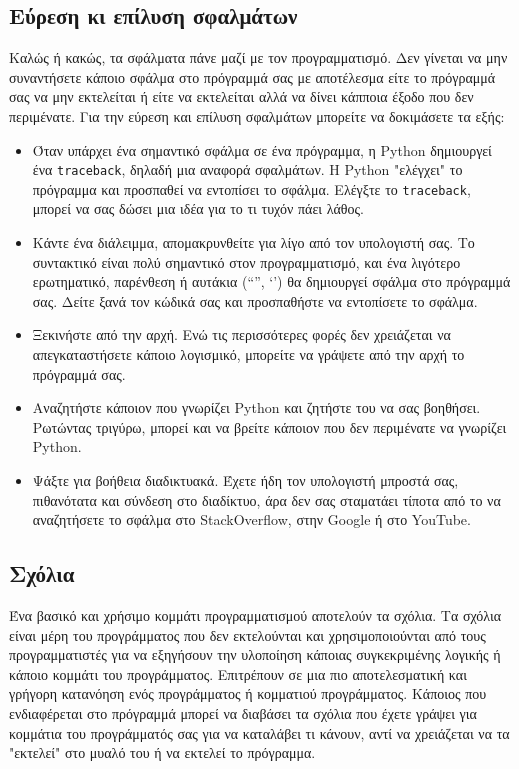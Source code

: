 \documentclass[14pt]{extreport}
\begin{document}
\subsection{Εύρεση κι επίλυση σφαλμάτων}

Καλώς ή κακώς, τα σφάλματα πάνε μαζί με τον προγραμματισμό. Δεν γίνεται να μην συναντήσετε κάποιο σφάλμα στο πρόγραμμά σας με αποτέλεσμα είτε το πρόγραμμά σας να μην εκτελείται ή είτε να εκτελείται αλλά να δίνει κάπποια έξοδο που δεν περιμένατε. Για την εύρεση και επίλυση σφαλμάτων μπορείτε να δοκιμάσετε τα εξής:

\begin{itemize}
    \itemsep0cm
    \item Όταν υπάρχει ένα σημαντικό σφάλμα σε ένα πρόγραμμα, η Python δημιουργεί ένα \lstinline{traceback}, δηλαδή μια αναφορά σφαλμάτων. Η Python "ελέγχει" το πρόγραμμα και προσπαθεί να εντοπίσει το σφάλμα. Ελέγξτε το \lstinline{traceback}, μπορεί να σας δώσει μια ιδέα για το τι τυχόν πάει λάθος.
    \item Κάντε ένα διάλειμμα, απομακρυνθείτε για λίγο από τον υπολογιστή σας. Το συντακτικό είναι πολύ σημαντικό στον προγραμματισμό, και ένα λιγότερο ερωτηματικό, παρένθεση ή αυτάκια (“”, ‘’) θα δημιουργεί σφάλμα στο πρόγραμμά σας. Δείτε ξανά τον κώδικά σας και προσπαθήστε να εντοπίσετε το σφάλμα.
    \item Ξεκινήστε από την αρχή. Ενώ τις περισσότερες φορές δεν χρειάζεται να απεγκαταστήσετε κάποιο λογισμικό, μπορείτε να γράψετε από την αρχή το πρόγραμμά σας.
    \item Αναζητήστε κάποιον που γνωρίζει Python και ζητήστε του να σας βοηθήσει. Ρωτώντας τριγύρω, μπορεί και να βρείτε κάποιον που δεν περιμένατε να γνωρίζει Python.
    \item Ψάξτε για βοήθεια διαδικτυακά. Έχετε ήδη τον υπολογιστή μπροστά σας, πιθανότατα και σύνδεση στο διαδίκτυο, άρα δεν σας σταματάει τίποτα από το να αναζητήσετε το σφάλμα στο StackOverflow, στην Google ή στο YouTube.
\end{itemize}

\subsection{Σχόλια}

Ένα βασικό και χρήσιμο κομμάτι προγραμματισμού αποτελούν τα σχόλια. Τα σχόλια είναι μέρη του προγράμματος που δεν εκτελούνται και χρησιμοποιούνται από τους προγραμματιστές για να εξηγήσουν την υλοποίηση κάποιας συγκεκριμένης λογικής ή κάποιο κομμάτι του προγράμματος. Επιτρέπουν σε μια πιο αποτελεσματική και γρήγορη κατανόηση ενός προγράμματος ή κομματιού προγράμματος. Κάποιος που ενδιαφέρεται στο πρόγραμμά μπορεί να διαβάσει τα σχόλια που έχετε γράψει για κομμάτια του προγράμματός σας για να καταλάβει τι κάνουν, αντί να χρειάζεται να τα "εκτελεί" στο μυαλό του ή να εκτελεί το πρόγραμμα.
\end{document}
